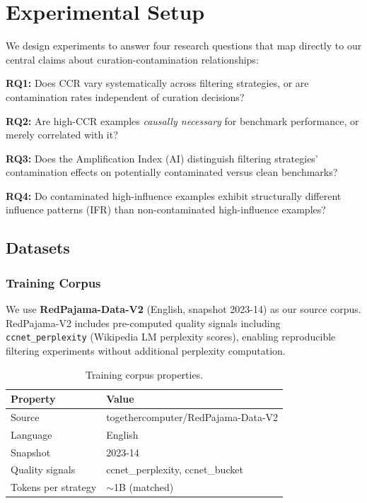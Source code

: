 \section{Experimental Setup}

We design experiments to answer four research questions that map directly to our central claims about curation-contamination relationships:

\textbf{RQ1:} Does CCR vary systematically across filtering strategies, or are contamination rates independent of curation decisions?

\textbf{RQ2:} Are high-CCR examples \textit{causally necessary} for benchmark performance, or merely correlated with it?

\textbf{RQ3:} Does the Amplification Index (AI) distinguish filtering strategies' contamination effects on potentially contaminated versus clean benchmarks?

\textbf{RQ4:} Do contaminated high-influence examples exhibit structurally different influence patterns (IFR) than non-contaminated high-influence examples?

\subsection{Datasets}

\subsubsection{Training Corpus}

We use \textbf{RedPajama-Data-V2} (English, snapshot 2023-14) as our source corpus. RedPajama-V2 includes pre-computed quality signals including \texttt{ccnet\_perplexity} (Wikipedia LM perplexity scores), enabling reproducible filtering experiments without additional perplexity computation.

\begin{table}[h]
\centering
\begin{tabular}{@{}ll@{}}
\toprule
Property & Value \\
\midrule
Source & togethercomputer/RedPajama-Data-V2 \\
Language & English \\
Snapshot & 2023-14 \\
Quality signals & ccnet\_perplexity, ccnet\_bucket \\
Tokens per strategy & $\sim$1B (matched) \\
\bottomrule
\end{tabular}
\caption{Training corpus properties.}
\end{table}


